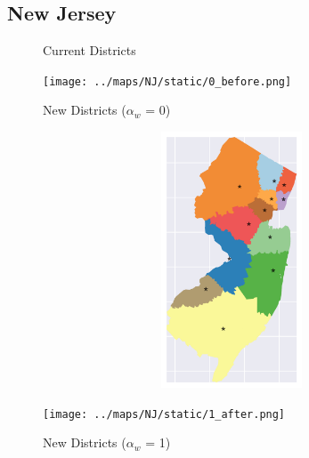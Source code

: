 \subsection{New Jersey}
\begin{figure}[htb!] \centering
\caption{ Current Districts }
\texttt{[image: ../maps/NJ/static/0\_before.png]}
\caption{ New Districts ($\alpha_w$ = 0) }
\includegraphics[width=5in,height=3in,keepaspectratio]{../maps/NJ/static/0_after.png}
\caption{ New Districts ($\alpha_w$ = 1) }
\texttt{[image: ../maps/NJ/static/1\_after.png]}
\end{figure}

\clearpage
\newpage

